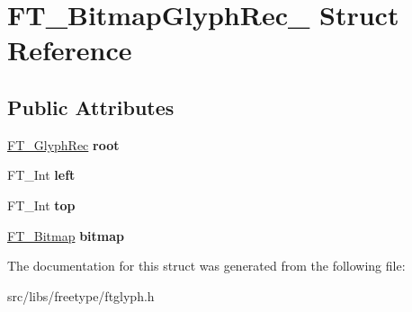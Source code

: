 \hypertarget{struct_f_t___bitmap_glyph_rec__}{
\section{FT\_\-BitmapGlyphRec\_\- Struct Reference}
\label{struct_f_t___bitmap_glyph_rec__}
}
\subsection*{Public Attributes}
\begin{DoxyCompactItemize}
\item 
\hypertarget{struct_f_t___bitmap_glyph_rec___ac3970353fbc0fe3d4c59c3fd608140f3}{
\hyperlink{struct_f_t___glyph_rec__}{FT\_\-GlyphRec} {\bfseries root}}
\label{struct_f_t___bitmap_glyph_rec___ac3970353fbc0fe3d4c59c3fd608140f3}

\item 
\hypertarget{struct_f_t___bitmap_glyph_rec___a6cfd2d89af7b6be4af886047c9cb7e0a}{
FT\_\-Int {\bfseries left}}
\label{struct_f_t___bitmap_glyph_rec___a6cfd2d89af7b6be4af886047c9cb7e0a}

\item 
\hypertarget{struct_f_t___bitmap_glyph_rec___a25fc81296678d6a2d064843c01bc05f7}{
FT\_\-Int {\bfseries top}}
\label{struct_f_t___bitmap_glyph_rec___a25fc81296678d6a2d064843c01bc05f7}

\item 
\hypertarget{struct_f_t___bitmap_glyph_rec___a16ecd0725920f8d5ad4c14e9448126ad}{
\hyperlink{struct_f_t___bitmap__}{FT\_\-Bitmap} {\bfseries bitmap}}
\label{struct_f_t___bitmap_glyph_rec___a16ecd0725920f8d5ad4c14e9448126ad}

\end{DoxyCompactItemize}


The documentation for this struct was generated from the following file:\begin{DoxyCompactItemize}
\item 
src/libs/freetype/ftglyph.h\end{DoxyCompactItemize}
